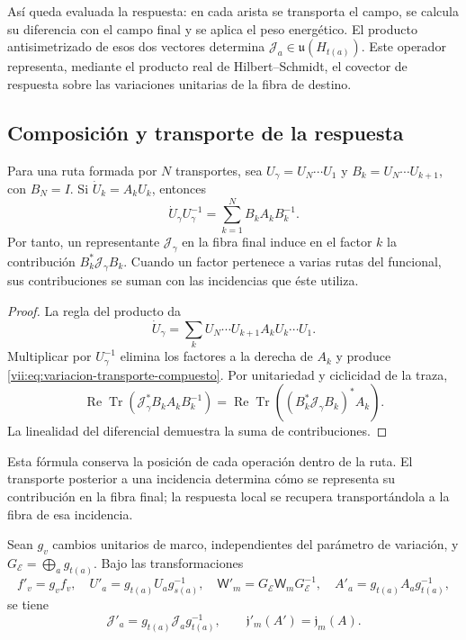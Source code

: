 Así queda evaluada la respuesta: en cada arista se transporta el campo,
se calcula su diferencia con el campo final y se aplica el peso energético.
El producto antisimetrizado de esos dos vectores determina
\(\mathcal J_a\in\mathfrak u(H_{t(a)})\). Este operador representa,
mediante el producto real de Hilbert--Schmidt, el covector de respuesta
sobre las variaciones unitarias de la fibra de destino.

\subsection{Composición y transporte de la respuesta}
\label{vii:subsec:composicion-respuesta}

\begin{proposition}
\label{vii:prop:composicion-respuesta}
Para una ruta formada por \(N\) transportes, sea
\(U_\gamma=U_N\cdots U_1\) y
\(B_k=U_N\cdots U_{k+1}\), con \(B_N=I\).
Si \(\dot U_k=A_kU_k\), entonces
\begin{equation}
 \dot U_\gamma U_\gamma^{-1}
 =\sum_{k=1}^N B_kA_kB_k^{-1}.
 \label{vii:eq:variacion-transporte-compuesto}
\end{equation}
Por tanto, un representante \(\mathcal J_\gamma\) en la fibra final
induce en el factor \(k\) la contribución
\(B_k^*\mathcal J_\gamma B_k\). Cuando un factor pertenece a varias
rutas del funcional, sus contribuciones se suman con las incidencias
que éste utiliza.
\end{proposition}

\begin{proof}
La regla del producto da
\[
 \dot U_\gamma=\sum_k
 U_N\cdots U_{k+1}A_kU_k\cdots U_1.
\]
Multiplicar por \(U_\gamma^{-1}\) elimina los factores a la derecha
de \(A_k\) y produce \eqref{vii:eq:variacion-transporte-compuesto}.
Por unitariedad y ciclicidad de la traza,
\[
 \operatorname{Re}\operatorname{Tr}
   (\mathcal J_\gamma^*B_kA_kB_k^{-1})
 =\operatorname{Re}\operatorname{Tr}
   ((B_k^*\mathcal J_\gamma B_k)^*A_k).
\]
La linealidad del diferencial demuestra la suma de contribuciones.
\end{proof}

Esta fórmula conserva la posición de cada operación dentro de la ruta.
El transporte posterior a una incidencia determina cómo se representa
su contribución en la fibra final; la respuesta local se recupera
transportándola a la fibra de esa incidencia.

\begin{proposition}
\label{vii:prop:covariancia-corriente-memoria}
Sean \(g_v\) cambios unitarios de marco, independientes del parámetro
de variación, y \(G_{\mathcal E}=\bigoplus_a g_{t(a)}\).
Bajo las transformaciones
\[
 f'_v=g_vf_v,\quad U'_a=g_{t(a)}U_ag_{s(a)}^{-1},\quad
 \mathsf W'_m=G_{\mathcal E}\mathsf W_mG_{\mathcal E}^{-1},\quad
 A'_a=g_{t(a)}A_ag_{t(a)}^{-1},
\]
se tiene
\begin{equation}
 \mathcal J'_a=g_{t(a)}\mathcal J_ag_{t(a)}^{-1},
 \qquad \mathfrak j'_m(A')=\mathfrak j_m(A).
 \label{vii:eq:covariancia-respuesta}
\end{equation}
\end{proposition}

